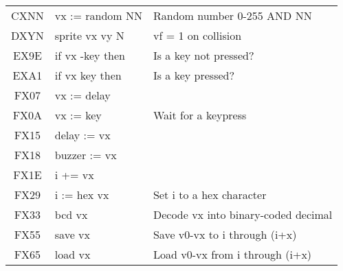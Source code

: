 \documentclass{article}
\begin{document}
\begin{center}
\begin{tabular}{| c | l | l |}
			CXNN                      & vx := random NN         & \textnormal{Random number 0-255 AND NN} \\
			\rowcolor[gray]{0.8} DXYN & sprite vx vy N          & \textnormal{vf = 1 on collision} \\
			EX9E                      & if vx -key then         & \textnormal{Is a key not pressed?} \\
			EXA1                      & if vx key then          & \textnormal{Is a key pressed?} \\
			FX07                      & vx := delay             & \\
			FX0A                      & vx := key               & \textnormal{Wait for a keypress} \\
			FX15                      & delay := vx             & \\
			FX18                      & buzzer := vx            & \\
			FX1E                      & i += vx                 & \\
			FX29                      & i := hex vx             & \textnormal{Set i to a hex character} \\
			FX33                      & bcd vx                  & \textnormal{Decode vx into binary-coded decimal}\\
			FX55                      & save vx                 & \textnormal{Save v0-vx to i through (i+x)} \\
			FX65                      & load vx                 & \textnormal{Load v0-vx from i through (i+x)} \\
			\hline
		\end{tabular}
	\end{center}
\end{document}
